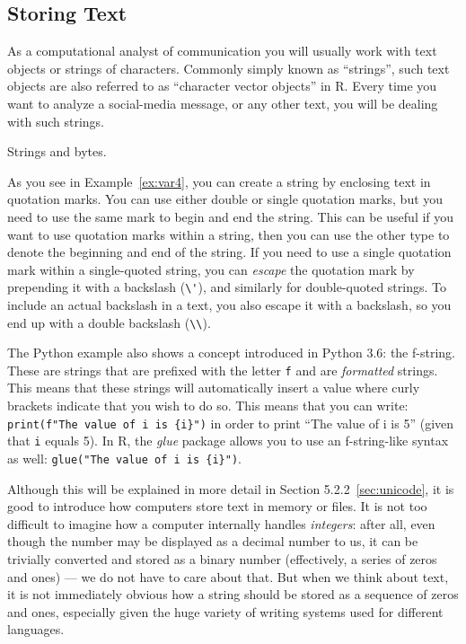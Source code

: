 \subsection{Storing Text}\label{sec:storingtext}

As a computational analyst of communication you will usually work with
text objects or strings of characters. Commonly simply known as ``strings'',
such text objects are also referred to as ``character vector objects'' in R.
Every time you want to analyze a social-media message, or any other text, you will be dealing with such strings. 

\begin{ccsexample}
  \caption{Strings and bytes.}\label{ex:var4}
 \end{ccsexample}

As you see in Example~\ref{ex:var4}, you can create a string by enclosing  text in quotation
marks. You can use either double or single quotation marks, but you
need to use the same mark to begin and end the string. This can be
useful if you want to use quotation marks within a string, then you can
use the other type to denote the beginning and end of the string.
If you need to use a single quotation mark within a single-quoted string,
you can \emph{escape} the quotation mark by prepending it with a backslash (\verb|\'|),
and similarly for double-quoted strings.
To include an actual backslash in a text, you also escape it with a backslash,
so you end up with a double backslash (\verb|\\|). 

The Python example also shows a concept introduced in Python 3.6:
the f-string. These are strings that are prefixed with the letter \texttt{f} and are \emph{formatted} strings.
This means that these strings will automatically insert a value where curly brackets indicate that you wish to do so.
This means that you can write: \verb|print(f"The value of i is {i}")| in order to print ``The value of i is 5'' (given that \verb|i| equals 5).
In R, the \emph{glue} package allows you to use an f-string-like syntax as well: \texttt{glue("The value of i is \{i\}")}.

Although this will be explained in more detail in Section 5.2.2~\ref{sec:unicode},
it is good to introduce how computers store text in memory or files. 
It is not too difficult to imagine how a computer internally
handles \emph{integers}: after all, even though the number may be displayed
as a decimal number to us, it can be trivially converted and stored
as a binary number (effectively, a series of zeros and ones)
--- we do not have to care about that.
But when we think about text, it is not
immediately obvious how a string should be stored as a sequence of
zeros and ones, especially given the huge variety of writing systems used for different languages. 

